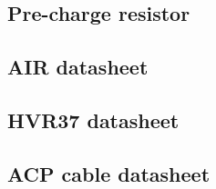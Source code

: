 \subsection{Pre-charge resistor}\label{app:precharge_resistors}
	

\subsection{AIR datasheet}\label{app:air_datasheet}
	
	
\subsection{HVR37 datasheet}\label{app:hvr37_datasheet}
	

\subsection{ACP cable datasheet}\label{app:PowerConductor}
	




\label{app:XT60connector}
